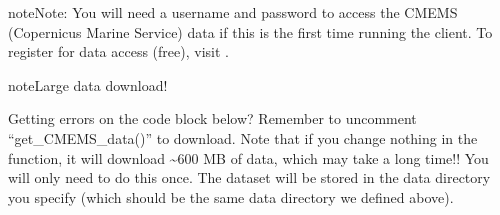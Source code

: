 \documentclass[letterpaper,10pt,english]{jupyterBook}
\begin{document}
\begin{sphinxShadowBox}
\sphinxstylesidebartitle{}

\begin{sphinxadmonition}{note}{Note:}
\sphinxAtStartPar
You will need a username and password to access the CMEMS (Copernicus Marine Service) data if this is the first time running the client. To register for data access (free), visit .
\end{sphinxadmonition}
\end{sphinxShadowBox}

\begin{sphinxadmonition}{note}{Large data download!}

\sphinxAtStartPar
Getting errors on the code block below? Remember to uncomment “get\_CMEMS\_data()” to download. Note that if you change nothing in the function, it will download \textasciitilde{}600 MB of data, which may take a long time!! You will only need to do this once. The dataset will be stored in the data directory you specify (which should be the same data directory we defined above).
\end{sphinxadmonition}
\end{document}
